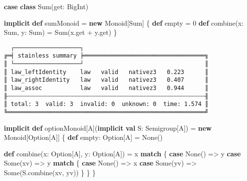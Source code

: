 \documentclass[
  ignorenonframetext,
]{beamer}
\newenvironment{Shaded}{}{}
\newcommand{\DecValTok}[1]{\textcolor[rgb]{0.25,0.63,0.44}{#1}}
\newcommand{\FunctionTok}[1]{\textcolor[rgb]{0.02,0.16,0.49}{#1}}
\newcommand{\KeywordTok}[1]{\textcolor[rgb]{0.00,0.44,0.13}{\textbf{#1}}}
\newcommand{\NormalTok}[1]{#1}
\begin{document}
\begin{frame}[fragile]

\begin{Shaded}
\begin{Highlighting}[]
\KeywordTok{case} \KeywordTok{class} \FunctionTok{Sum}\NormalTok{(get: BigInt)}

\KeywordTok{implicit} \KeywordTok{def}\NormalTok{ sumMonoid = }\KeywordTok{new}\NormalTok{ Monoid[Sum] \{}
  \KeywordTok{def}\NormalTok{ empty = }\DecValTok{0}
  \KeywordTok{def} \FunctionTok{combine}\NormalTok{(x: Sum, y: Sum) = }\FunctionTok{Sum}\NormalTok{(x.}\FunctionTok{get}\NormalTok{ + y.}\FunctionTok{get}\NormalTok{)}
\NormalTok{\}}
\end{Highlighting}
\end{Shaded}

\end{frame}

\begin{frame}[fragile]

\begin{verbatim}
  ┌───────────────────┐
╔═╡ stainless summary ╞═══════════════════════════════════╗
║ └───────────────────┘                                   ║
║ law_leftIdentity    law   valid   nativez3   0.223      ║
║ law_rightIdentity   law   valid   nativez3   0.407      ║
║ law_assoc           law   valid   nativez3   0.944      ║
╟┄┄┄┄┄┄┄┄┄┄┄┄┄┄┄┄┄┄┄┄┄┄┄┄┄┄┄┄┄┄┄┄┄┄┄┄┄┄┄┄┄┄┄┄┄┄┄┄┄┄┄┄┄┄┄┄┄╢
║ total: 3  valid: 3  invalid: 0  unknown: 0  time: 1.574 ║
╚═════════════════════════════════════════════════════════╝
\end{verbatim}

\end{frame}

\begin{frame}[fragile]

\begin{Shaded}
\begin{Highlighting}[]
\KeywordTok{implicit} \KeywordTok{def}\NormalTok{ optionMonoid[A](}\KeywordTok{implicit} \KeywordTok{val}\NormalTok{ S: Semigroup[A]) =}
  \KeywordTok{new}\NormalTok{ Monoid[Option[A]] \{}
    \KeywordTok{def}\NormalTok{ empty: Option[A] = None()}

    \KeywordTok{def} \FunctionTok{combine}\NormalTok{(x: Option[A], y: Option[A]) =}
\NormalTok{      x }\KeywordTok{match}\NormalTok{ \{}
        \KeywordTok{case}\NormalTok{ None()   => y}
        \KeywordTok{case}\NormalTok{ Some(xv) => y }\KeywordTok{match}\NormalTok{ \{}
          \KeywordTok{case}\NormalTok{ None()   => x}
          \KeywordTok{case}\NormalTok{ Some(yv) => Some(S.}\FunctionTok{combine}\NormalTok{(xv, yv))}
\NormalTok{        \}}
\NormalTok{      \}}
\NormalTok{  \}}
\end{Highlighting}
\end{Shaded}

\end{frame}
\end{document}
